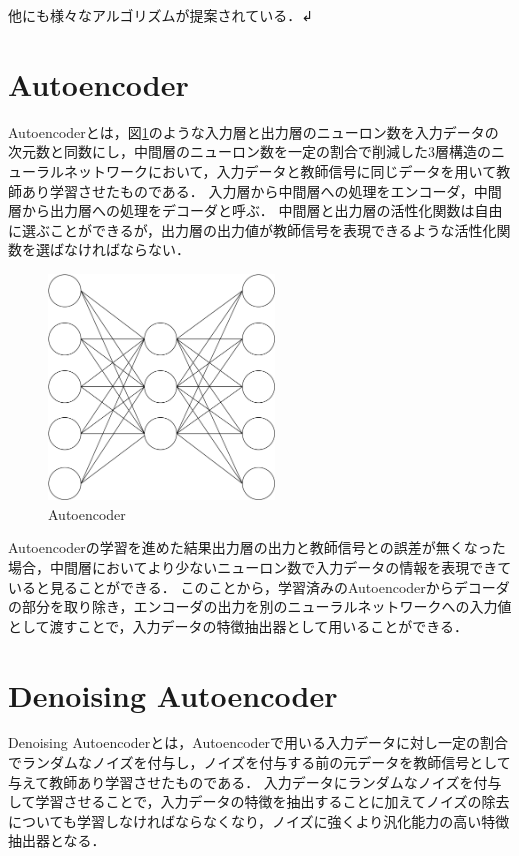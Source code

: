 他にも様々なアルゴリズムが提案されている．↲

\section{Autoencoder}
Autoencoderとは，図\ref{autoencoder}のような入力層と出力層のニューロン数を入力データの次元数と同数にし，中間層のニューロン数を一定の割合で削減した3層構造のニューラルネットワークにおいて，入力データと教師信号に同じデータを用いて教師あり学習させたものである．
入力層から中間層への処理をエンコーダ，中間層から出力層への処理をデコーダと呼ぶ．
中間層と出力層の活性化関数は自由に選ぶことができるが，出力層の出力値が教師信号を表現できるような活性化関数を選ばなければならない．

\begin{figure}[hbtp]
  \centering
  \includegraphics[bb=0 0 507 506, width=6cm]{Figures/autoencoder.pdf}
  \caption{Autoencoder}
  \label{autoencoder}
\end{figure}

Autoencoderの学習を進めた結果出力層の出力と教師信号との誤差が無くなった場合，中間層においてより少ないニューロン数で入力データの情報を表現できていると見ることができる．
このことから，学習済みのAutoencoderからデコーダの部分を取り除き，エンコーダの出力を別のニューラルネットワークへの入力値として渡すことで，入力データの特徴抽出器として用いることができる．

\section{Denoising Autoencoder}
Denoising Autoencoderとは，Autoencoderで用いる入力データに対し一定の割合でランダムなノイズを付与し，ノイズを付与する前の元データを教師信号として与えて教師あり学習させたものである．
入力データにランダムなノイズを付与して学習させることで，入力データの特徴を抽出することに加えてノイズの除去についても学習しなければならなくなり，ノイズに強くより汎化能力の高い特徴抽出器となる．

